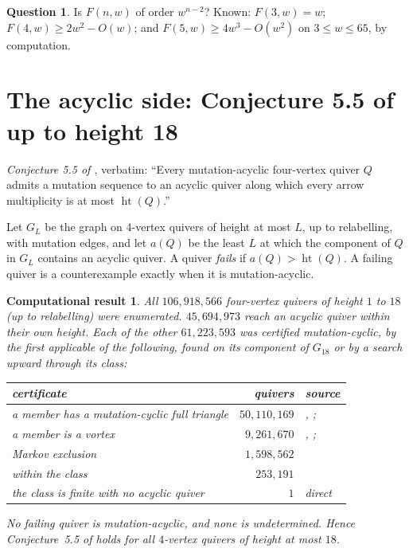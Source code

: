\documentclass[11pt]{amsart}
\newtheorem{computation}[theorem]{Computational result}
\theoremstyle{definition}
\newtheorem{question}[theorem]{Question}
\theoremstyle{remark}
\newcommand{\htt}{\operatorname{ht}}
\begin{document}
\begin{question}\label{q:degree}
Is $F(n,w)$ of order $w^{n-2}$? Known: $F(3,w)=w$; $F(4,w)\ge2w^2-O(w)$; and $F(5,w)\ge4w^3-O(w^2)$ on $3\le w\le65$, by computation.
\end{question}

\section{The acyclic side: Conjecture 5.5 of \texorpdfstring{\cite{AHJL}}{AHJL} up to height 18}\label{sec:conj55}

\emph{Conjecture 5.5 of \cite{AHJL}}, verbatim: ``Every mutation-acyclic four-vertex quiver $Q$ admits a mutation sequence to an acyclic quiver along which every arrow multiplicity is at most $\htt(Q)$.''

Let $G_L$ be the graph on $4$-vertex quivers of height at most $L$, up to relabelling, with mutation edges, and let $a(Q)$ be the least $L$ at which the component of $Q$ in $G_L$ contains an acyclic quiver. A quiver \emph{fails} if $a(Q)>\htt(Q)$. A failing quiver is a counterexample exactly when it is mutation-acyclic.

\begin{computation}\label{comp:conj55}
All $106{,}918{,}566$ four-vertex quivers of height $1$ to $18$ (up to relabelling) were enumerated. $45{,}694{,}973$ reach an acyclic quiver within their own height. Each of the other $61{,}223{,}593$ was certified mutation-cyclic, by the first applicable of the following, found on its component of $G_{18}$ or by a search upward through its class:
\begin{center}\small
\begin{tabular}{lrl}
\toprule
certificate & quivers & source\\
\midrule
a member has a mutation-cyclic full triangle & $50{,}110{,}169$ & \cite{BBH}, \cite{War-sub}; \cite[Prop.~2.1]{AHJL}\\
a member is a vortex & $9{,}261{,}670$ & \cite[Prop.~13.2]{FN-coq}, \cite{Nev}; \cite[Lemma~2.7]{AHJL}\\
Markov exclusion \cite[Lemma~2.4]{AHJL} & $1{,}598{,}562$ & \cite{Nev}\\
\cite[Cor.~5.2]{AHJL} within the class & $253{,}191$ & \cite[Thm.~5.1]{AHJL}\\
the class is finite with no acyclic quiver & $1$ & direct\\
\bottomrule
\end{tabular}
\end{center}
No failing quiver is mutation-acyclic, and none is undetermined. Hence Conjecture~5.5 of \cite{AHJL} holds for all $4$-vertex quivers of height at most $18$.
\end{computation}
\end{document}
